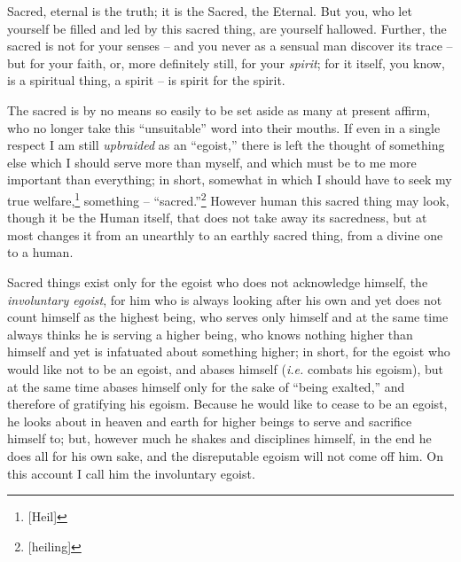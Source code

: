 Sacred, eternal is the truth; it is the Sacred, the Eternal. But you, who let 
yourself be filled and led by this sacred thing, are yourself hallowed. 
Further, the sacred is not for your senses -- and you never as a sensual man 
discover its trace -- but for your faith, or, more definitely still, for your 
\textit{spirit}; for it itself, you know, is a spiritual thing, a spirit -- is 
spirit for the spirit.

The sacred is by no means so easily to be set aside as many at present affirm, 
who no longer take this ``unsuitable'' word into their mouths. If even in a 
single respect I am still \textit{upbraided} as an ``egoist,'' there is left 
the thought of something else which I should serve more than myself, and which 
must be to me more important than everything; in short, somewhat in which I 
should have to seek my true welfare,\footnote{[Heil]} something -- 
``sacred.''\footnote{[heiling]} However human this sacred thing may look, 
though it be the Human itself, that does not take away its sacredness, but at 
most changes it from an unearthly to an earthly sacred thing, from a divine 
one to a human.

Sacred things exist only for the egoist who does not acknowledge himself, the 
\textit{involuntary egoist}, for him who is always looking after his own and 
yet does not count himself as the highest being, who serves only himself and 
at the same time always thinks he is serving a higher being, who knows nothing 
higher than himself and yet is infatuated about something higher; in short, 
for the egoist who would like not to be an egoist, and abases himself 
(\textit{i.e.} combats his egoism), but at the same time abases himself only 
for the sake of ``being exalted,'' and therefore of gratifying his egoism. 
Because he would like to cease to be an egoist, he looks about in heaven and 
earth for higher beings to serve and sacrifice himself to; but, however much 
he shakes and disciplines himself, in the end he does all for his own sake, 
and the disreputable egoism will not come off him. On this account I call him 
the involuntary egoist.

